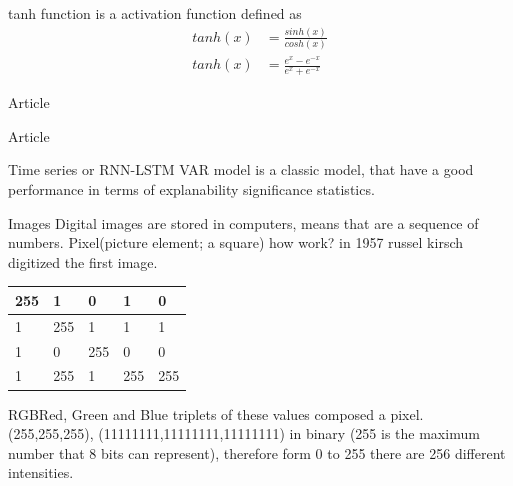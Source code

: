 \documentclass{beamer}
\begin{document}
\begin{frame}{tanh function}
is a activation function defined as 
\begin{equation}
\begin{align*}
tanh(x) &= \frac{sinh(x)}{cosh(x)} \\
tanh(x) &= \frac{e^{x} - e^{-x}}{e^{x} + e^{-x}}
\end{align*}
\end{equation}
\end{frame}




\begin{frame}{Article}

\end{frame}


\begin{frame}{Article}
\end{frame}




\begin{frame}{Time series or RNN-LSTM}
VAR model is a classic model, that have a good performance in terms of explanability significance statistics.


\end{frame}

\begin{frame}{Images}
Digital images are stored in computers, means that are a sequence of numbers.
Pixel(picture element; a square) how work? in 1957 russel kirsch digitized the first image.

\begin{table}[]
\begin{tabular}{|l|l|l|l|l|}
\hline
255 & 1   & 0   & 1   & 0   \\ \hline
1   & 255 & 1   & 1   & 1   \\ \hline
1   & 0   & 255 & 0   & 0   \\ \hline
1   & 255 & 1   & 255 & 255 \\ \hline
\end{tabular}
\end{table}

\end{frame}

\begin{frame}{RGB}{Red, Green and Blue}
triplets of these values composed a pixel.
(255,255,255), (11111111,11111111,11111111) in binary (255 is the maximum number that 8 bits can represent), therefore form 0 to 255 there are 256 different intensities.




\end{frame}
\end{document}
